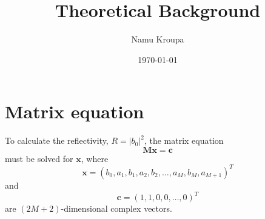 \documentclass[]{article}
\title{Theoretical Background}
\author{Namu Kroupa}
\date{\today}
\begin{document}
	\maketitle
	
	\section{Matrix equation}
	To calculate the reflectivity, $R=|b_0|^2$, the matrix equation 
	\begin{equation}
		\mathbf{M}\mathbf{x}=\mathbf{c}
	\end{equation}
	must be solved for $\mathbf{x}$, where
	\begin{equation}\label{eqn:matrix-equation}
		\mathbf{x}=(b_0,a_1,b_1,a_2,b_2,\dots,a_M,b_M,a_{M+1})^T
	\end{equation}
	and
	\begin{equation}
		\mathbf{c}=(1,1,0,0,\dots,0)^T
	\end{equation}
	are $(2M+2)$-dimensional complex vectors.
	
\end{document}
